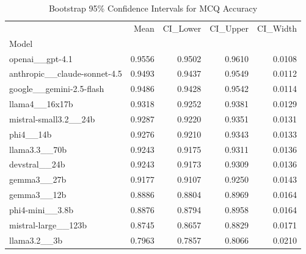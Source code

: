 \begin{table}[htbp]
\centering
\caption{Bootstrap 95\% Confidence Intervals for MCQ Accuracy}
\label{tab:bootstrap_ci}
\begin{tabular}{lrrrr}
\toprule
 & Mean & CI_Lower & CI_Upper & CI_Width \\
Model &  &  &  &  \\
\midrule
openai__gpt-4.1 & 0.9556 & 0.9502 & 0.9610 & 0.0108 \\
anthropic__claude-sonnet-4.5 & 0.9493 & 0.9437 & 0.9549 & 0.0112 \\
google__gemini-2.5-flash & 0.9486 & 0.9428 & 0.9542 & 0.0114 \\
llama4__16x17b & 0.9318 & 0.9252 & 0.9381 & 0.0129 \\
mistral-small3.2__24b & 0.9287 & 0.9220 & 0.9351 & 0.0131 \\
phi4__14b & 0.9276 & 0.9210 & 0.9343 & 0.0133 \\
llama3.3__70b & 0.9243 & 0.9175 & 0.9311 & 0.0136 \\
devstral__24b & 0.9243 & 0.9173 & 0.9309 & 0.0136 \\
gemma3__27b & 0.9177 & 0.9107 & 0.9250 & 0.0143 \\
gemma3__12b & 0.8886 & 0.8804 & 0.8969 & 0.0164 \\
phi4-mini__3.8b & 0.8876 & 0.8794 & 0.8958 & 0.0164 \\
mistral-large__123b & 0.8745 & 0.8657 & 0.8829 & 0.0171 \\
llama3.2__3b & 0.7963 & 0.7857 & 0.8066 & 0.0210 \\
\bottomrule
\end{tabular}

\end{table}
